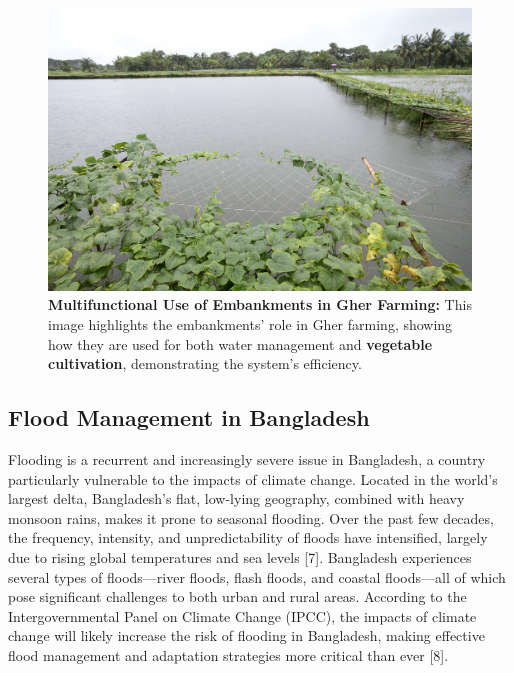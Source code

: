 \documentclass[conference]{IEEEtran}
\begin{document}
\begin{figure}[h]
    \centering
    \includegraphics[width=\linewidth]{gher_embankments.jpg}
    \caption{\textbf{Multifunctional Use of Embankments in Gher Farming: } This image highlights the embankments’ role in Gher farming, showing how they are used for both water management and \textbf{vegetable cultivation}, demonstrating the system’s efficiency. }
    \label{fig:gher_embankments}
\end{figure}


\subsection{\textbf{Flood Management in Bangladesh}}
Flooding is a recurrent and increasingly severe issue in Bangladesh, a country particularly vulnerable to the impacts of climate change. Located in the world’s largest delta, Bangladesh's flat, low-lying geography, combined with heavy monsoon rains, makes it prone to seasonal flooding. Over the past few decades, the frequency, intensity, and unpredictability of floods have intensified, largely due to rising global temperatures and sea levels [7]. Bangladesh experiences several types of floods—river floods, flash floods, and coastal floods—all of which pose significant challenges to both urban and rural areas. According to the Intergovernmental Panel on Climate Change (IPCC), the impacts of climate change will likely increase the risk of flooding in Bangladesh, making effective flood management and adaptation strategies more critical than ever [8].
\end{document}
